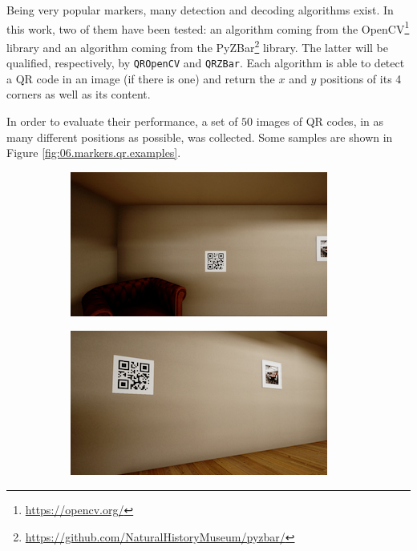Being very popular markers, many detection and decoding algorithms exist. In this work, two of them have been tested: an algorithm coming from the OpenCV\footnote{\url{https://opencv.org/}} library and an algorithm coming from the PyZBar\footnote{\url{https://github.com/NaturalHistoryMuseum/pyzbar/}} library. The latter will be qualified, respectively, by \texttt{QROpenCV} and \texttt{QRZBar}. Each algorithm is able to detect a QR code in an image (if there is one) and return the $x$ and $y$ positions of its 4 corners as well as its content.

In order to evaluate their performance, a set of $\num{50}$ images of QR codes, in as many different positions as possible, was collected. Some samples are shown in Figure \ref{fig:06.markers.qr.examples}.

\begin{figure}[H]
    \centering
    \begin{subfigure}{0.32\textwidth}
        \centering
        \includegraphics[width=\textwidth]{resources/png/06/markers/qr/0.png}
        \vspace{0.5em}
    \end{subfigure}
    \hfill
    \begin{subfigure}{0.32\textwidth}
        \centering
        \includegraphics[width=\textwidth]{resources/png/06/markers/qr/1.png}

\end{subfigure}
\end{figure}
